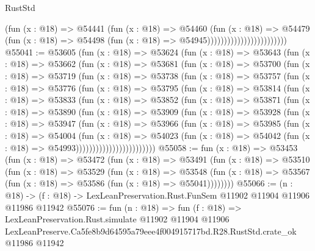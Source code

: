 \begin{lexlean}{RustStd}
\begin{coremodule}
                                          (fun (x : @18) =>
                                          @54441
                                            (fun (x : @18) =>
                                            @54460
                                              (fun (x : @18) =>
                                              @54479
                                                (fun (x : @18) =>
                                                @54498
                                                  (fun (x : @18) => @54945))))))))))))))))))))))))
@55041 := @53605
    (fun (x : @18) =>
    @53624
      (fun (x : @18) =>
      @53643
        (fun (x : @18) =>
        @53662
          (fun (x : @18) =>
          @53681
            (fun (x : @18) =>
            @53700
              (fun (x : @18) =>
              @53719
                (fun (x : @18) =>
                @53738
                  (fun (x : @18) =>
                  @53757
                    (fun (x : @18) =>
                    @53776
                      (fun (x : @18) =>
                      @53795
                        (fun (x : @18) =>
                        @53814
                          (fun (x : @18) =>
                          @53833
                            (fun (x : @18) =>
                            @53852
                              (fun (x : @18) =>
                              @53871
                                (fun (x : @18) =>
                                @53890
                                  (fun (x : @18) =>
                                  @53909
                                    (fun (x : @18) =>
                                    @53928
                                      (fun (x : @18) =>
                                      @53947
                                        (fun (x : @18) =>
                                        @53966
                                          (fun (x : @18) =>
                                          @53985
                                            (fun (x : @18) =>
                                            @54004
                                              (fun (x : @18) =>
                                              @54023
                                                (fun (x : @18) =>
                                                @54042
                                                  (fun (x : @18) => @54993))))))))))))))))))))))))
@55058 := fun (x : @18) =>
  @53453
    (fun (x : @18) =>
    @53472
      (fun (x : @18) =>
      @53491
        (fun (x : @18) =>
        @53510
          (fun (x : @18) =>
          @53529
            (fun (x : @18) =>
            @53548
              (fun (x : @18) => @53567 (fun (x : @18) => @53586 (fun (x : @18) => @55041))))))))
@55066 := (n : @18) ->
  (f : @18) -> LexLeanPreservation.Rust.FunSem @11902 @11904 @11906 @11986 @11942
@55076 := fun (n : @18) =>
  fun (f : @18) =>
  LexLeanPreservation.Rust.simulate
    @11902
    @11904
    @11906
    LexLeanPreserve.Ca5fe8b9d64595a79eee4f004915717bd.R28.RustStd.crate_ok
    @11986
    @11942
\end{coremodule}
\end{lexlean}
